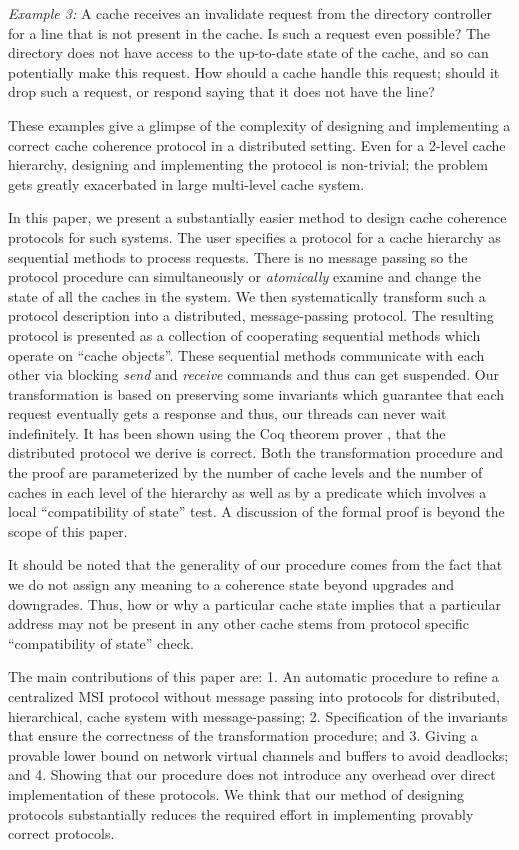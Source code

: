 \noindent \emph{Example 3:} A cache receives an invalidate request from the
directory controller for a line that is not present in the cache. Is such a
request even possible? The directory does not have access to the up-to-date
state of the cache, and so can potentially make this request. How should a
cache handle this request; should it drop such a request, or respond saying
that it does not have the line?

These examples give a glimpse of the complexity of designing and implementing a
correct cache coherence protocol in a distributed setting.  Even for a 2-level
cache hierarchy, designing and implementing the protocol is non-trivial; the
problem gets greatly exacerbated in large multi-level cache system. 

In this paper, we present a substantially easier method to design cache
coherence protocols for such systems. The user specifies a protocol for a cache
hierarchy as sequential methods to process requests. There is no message
passing so the protocol procedure can simultaneously or \emph{atomically}
examine and change the state of all the caches in the system. We then
systematically transform such a protocol description into a distributed,
message-passing protocol. The resulting protocol is presented as a collection
of cooperating sequential methods which operate on ``cache objects''.  These
sequential methods communicate with each other via blocking \emph{send} and
\emph{receive} commands and thus can get suspended. Our transformation is based
on preserving some invariants which guarantee that each request eventually gets
a response and thus, our threads can never wait indefinitely.  It has been
shown using the Coq theorem prover \cite{}, that the distributed protocol we
derive is correct.  Both the transformation procedure and the proof are
parameterized by the number of cache levels and the number of caches in each
level of the hierarchy as well as by a predicate which involves a local
``compatibility of state'' test. A discussion of the formal proof is beyond the
scope of this paper. 

It should be noted that the generality of our procedure comes from the fact
that we do not assign any meaning to a coherence state beyond upgrades and
downgrades. Thus, how or why a particular cache state implies that a particular
address may not be present in any other cache stems from protocol specific
``compatibility of state'' check. 

The main contributions of this paper are: 1. An automatic procedure to refine a
centralized MSI protocol without message passing into protocols for
distributed, hierarchical, cache system with message-passing; 2. Specification
of the invariants that ensure the correctness of the transformation procedure;
and 3. Giving a provable lower bound on network virtual channels and buffers to
avoid deadlocks; and 4. Showing that our procedure does not introduce any
overhead over direct implementation of these protocols.  We think that our
method of designing protocols substantially reduces the required effort in
implementing provably correct protocols. 

